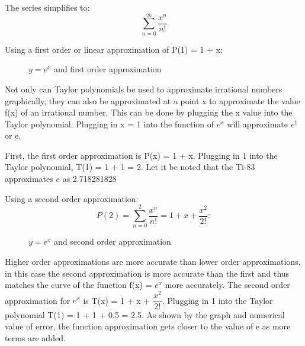 \documentclass[12pt, titlepage]{article}
\begin{document}
The series simplifies to:
\begin{equation*}
  \sum_{n=0}^{\infty} \frac{x^{n}}{n!}
\end{equation*}

\pagebreak
Using a first order or linear approximation of P(1) = 1 + x:
\begin{figure}[H]
\centering
    \caption[]{\(y=e^x\) and first order approximation}
\end{figure}

Not only can Taylor polynomials be used to approximate irrational numbers graphically, they can also be approximated at a point x to approximate the value f(x) of an irrational number. This can be done by plugging the x value into the Taylor polynomial. Plugging in x = 1 into the function of \(e^x\) will  approximate \(e^1\) or e. 

First, the first order approximation is P(x) = 1 + x. Plugging in 1 into the Taylor polynomial, T(1) = 1 + 1 = 2. Let it be noted that the Ti-83 approximates \(e\) as 2.718281828

Using a second order approximation:
\begin{equation*}
  P(2) = \sum_{n=0}^{2} \dfrac{x^{n}}{n!} = 1 + x + \dfrac{x^{2}}{2!}:
\end{equation*}

\begin{figure}[H]
\centering
    \caption[]{\(y=e^x\) and second order approximation}
\end{figure}

Higher order approximations are more accurate than lower order approximations, in this case the second approximation is more accurate than the first and thus matches the curve of the function f(x) = \(e^{x}\) more accurately. The second order approximation for \(e^{x}\) is T(x) = 1 + x + \(\dfrac{x^2}{2!}\). Plugging in 1 into the Taylor polynomial T(1) = 1 + 1 + 0.5 = 2.5. As shown by the graph and numerical value of error, the function approximation gets closer to the value of e as more terms are added.
\end{document}
